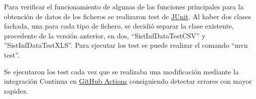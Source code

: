 Para verificar el funcionamiento de algunas de las funciones principales para la obtención de datos de los ficheros se realizaron test de \href{https://junit.org/junit5/}{JUnit}. Al haber dos clases fachada, una para cada tipo de fichero, se decidió separar la clase existente, procedente de la versión anterior, en dos, ``SistInfDataTestCSV'' y ''SistInfDataTestXLS''. Para ejecutar los test se puede realizar el comando ``mvn test''.

Se ejecutaron los test cada vez que se realizaba una modificación mediante la integración Continua en \href{https://github.com/dbo1001/Gestor-TFG-2021/actions}{GitHub Actions} consiguiendo detectar errores con mayor rapidez.